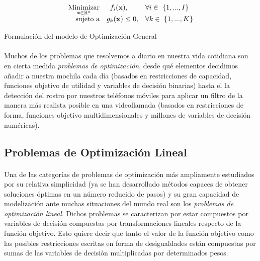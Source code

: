 \documentclass{subfiles}
\begin{document}
        \begin{eqfloat}
          \begin{equation}
            \begin{array}{rr@{}ll}
              \underset{\mathbf{x} \in \mathbb{R}^{n}}{\text{Minimizar}} & f_i(\mathbf{x}) &                 ,& \forall i \in \{1,...,I\} \\
              \text{sujeto a}	 & g_k(\mathbf{x}) \ &\leq 0, & \forall k \in \{1,...,K\}
            \end{array}
          \end{equation}
          \caption{Formulación del modelo de Optimización General}
          \label{eq:general_optimization_formulation}
        \end{eqfloat}

        \paragraph{}
        Muchos de los problemas que resolvemos a diario en nuestra vida cotidiana son en cierta medida \emph{problemas de optimización}, desde qué elementos decidimos añadir a nuestra mochila cada día (basados en restricciones de capacidad, funciones objetivo de utilidad y variables de decisión binarias) hasta el la detección del rostro por nuestros teléfonos móviles para aplicar un filtro de la manera más realista posible en una videollamada (basados en restricciones de forma, funciones objetivo multidimensionales y millones de variables de decisión numéricas).

      \subsection{Problemas de Optimización Lineal}
      \label{sec:formulation_linear_problems}

        \paragraph{}
        Una de las categorías de problemas de optimización más ampliamente estudiados por su relativa simplicidad (ya se han desarrollado métodos capaces de obtener soluciones óptimas en un número reducido de pasos) y su gran capacidad de modelización ante muchas situaciones del mundo real son los \emph{problemas de optimización lineal}. Dichos problemas se caracterizan por estar compuestos por variables de decisión compuestas por transformaciones lineales respecto de la función objetivo. Esto quiere decir que tanto el valor de la función objetivo como las posibles restricciones escritas en forma de desigualdades están compuestas por sumas de las variables de decisión multiplicadas por determinados pesos.
\end{document}
